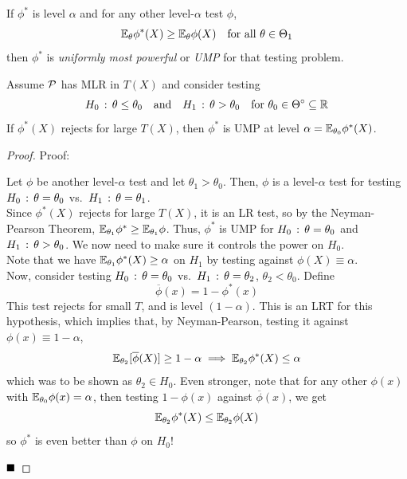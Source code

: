 \begin{definition}
    If $\phi^{*}$ is level $\alpha$ and for any other level-$\alpha$ test $\phi$,
    \[ \E_{\theta}\phi^{*}(X) \geq \E_{\theta}\phi(X) \quad \tt{for all } \theta \in \Theta_1 \]
    then $\phi^{*}$ is \emph{uniformly most powerful} or \emph{UMP} for that testing problem.
\end{definition}

\begin{theorem}
    Assume $\cal{P}$ has MLR in $T(X)$ and consider testing
    \[ H_0 \col \theta \leq \theta_0 \quad \tt{and} \quad H_1 \col \theta > \theta_0 \quad \tt{for } \theta_0 \in \Theta^{\circ} \subseteq \R \]
    If $\phi^{*}(X)$ rejects for large $T(X)$, then $\phi^{*}$ is UMP at level $\alpha = \E_{\theta_0}\phi^{*}(X)$.
\end{theorem}
\begin{proof}{Proof:}
    
    Let $\phi$ be another level-$\alpha$ test and let $\theta_1 > \theta_0$. Then, $\phi$ is a level-$\alpha$ test for testing $H_0 \col \theta = \theta_0$ vs.\ $H_1 \col \theta = \theta_1$.\\

    Since $\phi^{*}(X)$ rejects for large $T(X)$, it is an LR test, so by the Neyman-Pearson Theorem, $\E_{\theta_1}\phi^{*} \geq \E_{\theta_1}\phi$. Thus, $\phi^{*}$ is UMP for $H_0 \col \theta = \theta_0$ and $H_1 \col \theta > \theta_0$. We now need to make sure it controls the power on $H_0$.\\

    Note that we have $\E_{\theta_1}\phi^{*}(X) \geq \alpha$ on $H_1$ by testing against $\phi(X) \equiv \alpha$.\\

    Now, consider testing $H_0 \col \theta = \theta_0$ vs.\ $H_1 \col \theta = \theta_2$, $\theta_2 < \theta_0$. Define
    \[ \overline{\phi}(x) = 1 - \phi^{*}(x) \]
    This test rejects for small $T$, and is level $(1 - \alpha)$. This is an LRT for this hypothesis, which implies that, by Neyman-Pearson, testing it against $\phi(x) \equiv 1 - \alpha$,
    \[ \E_{\theta_2}[\overline{\phi}(X)] \geq 1 - \alpha \implies \E_{\theta_2}\phi^{*}(X) \leq \alpha \]
    which was to be shown as $\theta_2 \in H_0$. Even stronger, note that for any other $\phi(x)$ with $\E_{\theta_0}\phi(x) = \alpha$, then testing $1 - \phi(x)$ against $\overline{\phi}(x)$, we get
    \[ \E_{\theta_2}\phi^{*}(X) \leq \E_{\theta_2}\phi(X) \]
    so $\phi^{*}$ is even better than $\phi$ on $H_0$!

    $\qed$
\end{proof}

